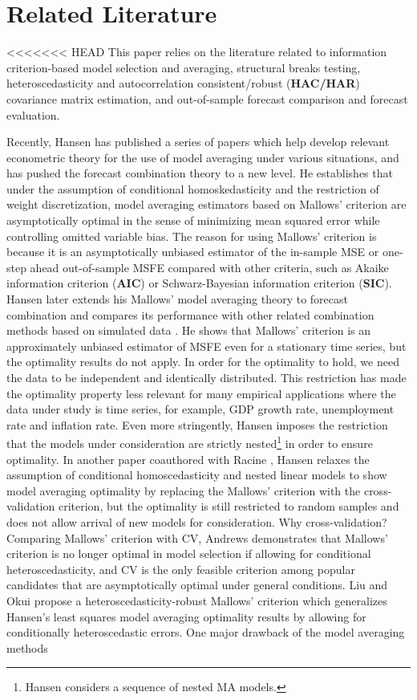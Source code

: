 \section{Related Literature}
<<<<<<< HEAD
This paper relies on the literature related to information criterion-based model selection and averaging, structural breaks testing, heteroscedasticity and autocorrelation consistent/robust (\textbf{HAC/HAR}) covariance matrix estimation, and out-of-sample forecast comparison and forecast evaluation.

Recently, Hansen has published a series of papers \cite{hansen_EMETRICA2007} \cite{hansen_JE2008} \cite{hansen2009averaging} \cite{hansen2011jackknife} which help develop relevant econometric theory for the use of model averaging under various situations, and has pushed the forecast combination theory to a new level. He establishes that under the assumption of conditional homoskedasticity and the restriction of weight discretization, model averaging estimators based on Mallows' criterion are asymptotically optimal in the sense of minimizing mean squared error while controlling omitted variable bias. The reason for using Mallows' criterion is because it is an asymptotically unbiased estimator of the in-sample MSE or one-step ahead out-of-sample MSFE compared with other criteria, such as Akaike information criterion (\textbf{AIC}) or Schwarz-Bayesian information criterion (\textbf{SIC}). Hansen later extends his Mallows' model averaging theory to forecast combination and compares its performance with other related combination methods based on simulated data \cite{hansen_JE2008}. He shows that Mallows' criterion is an approximately unbiased estimator of MSFE even for a stationary time series, but the optimality results do not apply. In order for the optimality to hold, we need the data to be independent and identically distributed. This restriction has made the optimality property less relevant for many empirical applications where the data under study is time series, for example, GDP growth rate, unemployment rate and inflation rate. Even more stringently, Hansen imposes the restriction that the models under consideration are strictly nested\footnote{Hansen considers a sequence of nested MA models.} in order to ensure optimality. In another paper coauthored with Racine \cite{hansen2011jackknife}, Hansen relaxes the assumption of conditional homoscedasticity and nested linear models to show model averaging optimality by replacing the Mallows' criterion with the cross-validation criterion, but the optimality is still restricted to random samples and does not allow arrival of new models for consideration. Why cross-validation? Comparing Mallows' criterion with CV, Andrews \cite{andrews_JE1991} demonstrates that Mallows' criterion is no longer optimal in model selection if allowing for conditional heteroscedasticity, and CV is the only feasible criterion among popular candidates that are asymptotically optimal under general conditions. Liu and Okui \cite{liu_okui2012} propose a heteroscedasticity-robust Mallows' criterion which generalizes Hansen's least squares model averaging optimality results by allowing for conditionally heteroscedastic errors. One major drawback of the model averaging methods 